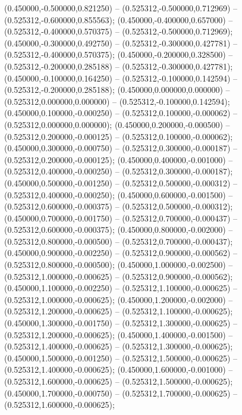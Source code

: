  (0.450000,-0.500000,0.821250) -- (0.525312,-0.500000,0.712969) -- (0.525312,-0.600000,0.855563);
 (0.450000,-0.400000,0.657000) -- (0.525312,-0.400000,0.570375) -- (0.525312,-0.500000,0.712969);
 (0.450000,-0.300000,0.492750) -- (0.525312,-0.300000,0.427781) -- (0.525312,-0.400000,0.570375);
 (0.450000,-0.200000,0.328500) -- (0.525312,-0.200000,0.285188) -- (0.525312,-0.300000,0.427781);
 (0.450000,-0.100000,0.164250) -- (0.525312,-0.100000,0.142594) -- (0.525312,-0.200000,0.285188);
 (0.450000,0.000000,0.000000) -- (0.525312,0.000000,0.000000) -- (0.525312,-0.100000,0.142594);
 (0.450000,0.100000,-0.000250) -- (0.525312,0.100000,-0.000062) -- (0.525312,0.000000,0.000000);
 (0.450000,0.200000,-0.000500) -- (0.525312,0.200000,-0.000125) -- (0.525312,0.100000,-0.000062);
 (0.450000,0.300000,-0.000750) -- (0.525312,0.300000,-0.000187) -- (0.525312,0.200000,-0.000125);
 (0.450000,0.400000,-0.001000) -- (0.525312,0.400000,-0.000250) -- (0.525312,0.300000,-0.000187);
 (0.450000,0.500000,-0.001250) -- (0.525312,0.500000,-0.000312) -- (0.525312,0.400000,-0.000250);
 (0.450000,0.600000,-0.001500) -- (0.525312,0.600000,-0.000375) -- (0.525312,0.500000,-0.000312);
 (0.450000,0.700000,-0.001750) -- (0.525312,0.700000,-0.000437) -- (0.525312,0.600000,-0.000375);
 (0.450000,0.800000,-0.002000) -- (0.525312,0.800000,-0.000500) -- (0.525312,0.700000,-0.000437);
 (0.450000,0.900000,-0.002250) -- (0.525312,0.900000,-0.000562) -- (0.525312,0.800000,-0.000500);
 (0.450000,1.000000,-0.002500) -- (0.525312,1.000000,-0.000625) -- (0.525312,0.900000,-0.000562);
 (0.450000,1.100000,-0.002250) -- (0.525312,1.100000,-0.000625) -- (0.525312,1.000000,-0.000625);
 (0.450000,1.200000,-0.002000) -- (0.525312,1.200000,-0.000625) -- (0.525312,1.100000,-0.000625);
 (0.450000,1.300000,-0.001750) -- (0.525312,1.300000,-0.000625) -- (0.525312,1.200000,-0.000625);
 (0.450000,1.400000,-0.001500) -- (0.525312,1.400000,-0.000625) -- (0.525312,1.300000,-0.000625);
 (0.450000,1.500000,-0.001250) -- (0.525312,1.500000,-0.000625) -- (0.525312,1.400000,-0.000625);
 (0.450000,1.600000,-0.001000) -- (0.525312,1.600000,-0.000625) -- (0.525312,1.500000,-0.000625);
 (0.450000,1.700000,-0.000750) -- (0.525312,1.700000,-0.000625) -- (0.525312,1.600000,-0.000625);
